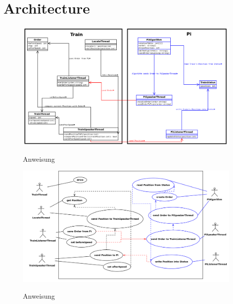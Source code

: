 \chapter{Architecture}

\begin{figure}[H]	
\caption{Anweisung}
\includegraphics[width=2\textwidth, width=465pt]{content/images/ClassDiagram.png}
\label{pic:anweisung}
\end{figure}

\begin{figure}[H]	
\caption{Anweisung}
\includegraphics[width=2\textwidth, width=465pt]{content/images/UseCaseDia.png}
\label{pic:anweisung}
\end{figure}